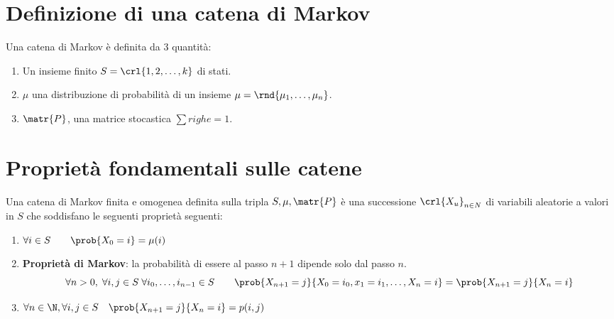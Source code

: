 \documentclass[\main/main.tex]{subfiles}
\begin{document}
\section{Definizione di una catena di Markov}
Una catena di Markov è definita da 3 quantità:
\begin{enumerate}
  \item Un insieme finito \(S = \crl{1, 2, \ldots, k}\) di stati.
  \item \(\mu \) una distribuzione di probabilità di un insieme \(\mu = \rnd{\mu_1, \ldots, \mu_n}\).
  \item \(\matr{P}\), una matrice stocastica \(\sum righe =1\).
\end{enumerate}
\section{Proprietà fondamentali sulle catene}
Una catena di Markov finita e omogenea definita sulla tripla \(S, \mu, \matr{P}\) è una successione \(\crl{X_u}_{n \in N}\) di variabili aleatorie a valori in \(S\) che soddisfano le seguenti proprietà seguenti:
\begin{enumerate}
  \item \(\forall i \in S \qquad \prob{X_0 = i} = \mu(i)\)
  \item \textbf{Proprietà di Markov}: la probabilità di essere al passo \(n+1\) dipende solo dal passo \(n\).
        \[
          \forall n > 0,\; \forall i,j \in S \; \forall i_0, \ldots, i_{n-1} \in S \qquad \prob{X_{n+1} = j}{X_0=i_0, x_1 = i_1, \ldots, X_n=i} = \prob{X_{n+1} = j}{X_n = i}
        \]
  \item \(\forall n \in \N, \forall i,j \in S \quad \prob{X_{n+1} = j}{X_n = i} = p(i,j)\)
\end{enumerate}
\end{document}
